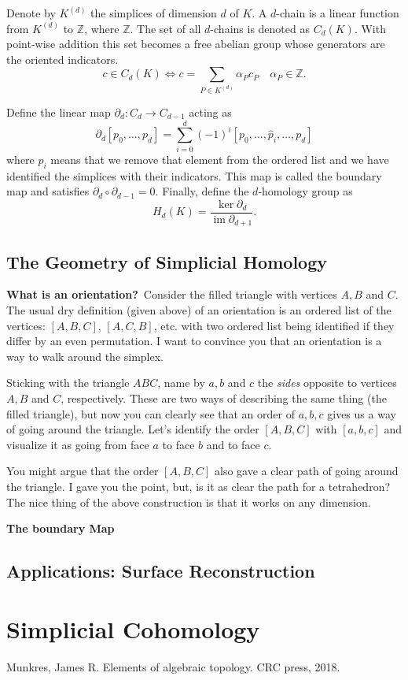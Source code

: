 \documentclass{article}
\newcommand{\Z}{\mathbb Z}
\DeclareMathOperator{\im}{im}
\begin{document}
Denote by \(K^{(d)}\) the simplices of dimension \(d\) of \(K\). A \(d\)-chain is
a linear function from \(K^{(d)}\) to \(\Z\), where \(\Z\).
The set of all \(d\)-chains is denoted as \(C_d(K)\). With point-wise addition
this set becomes a free abelian group whose generators are the oriented indicators.
\begin{displaymath}
  c\in C_d(K) \iff c = \sum_{P\in K^{(d)}} \alpha_P c_P
  \quad \alpha_P\in \Z.
\end{displaymath}

Define the linear map \(\partial_d\colon C_d \to C_{d-1}\) acting as
\begin{displaymath}
  \partial_d [p_0, \ldots, p_d] = \sum_{i=0}^{d} (-1)^{i} [p_0, \ldots, \hat p_i, \ldots, p_d]
\end{displaymath}
where \(\hat p_i\) means that we remove that element from the ordered list and we have identified
the simplices with their indicators.
This map is called the boundary map and satisfies \(\partial_{d} \circ
\partial_{d-1} = 0\). Finally, define the \(d\)-homology group as
\begin{displaymath}
  H_d(K) = \frac{\ker \partial_{d}}{\im \partial_{d+1}}.
\end{displaymath}

\subsection{The Geometry of Simplicial Homology}

\textbf{What is an orientation?}~Consider the filled triangle with vertices
\(A,B\) and \(C\). The usual dry definition (given above) of an orientation is an
ordered list of the vertices: \([A,B,C]\), \([A,C,B]\), etc. with two ordered
list being identified if they differ by an even permutation. I want to convince
you that an orientation is a way to walk around the simplex.

Sticking with the triangle \(ABC\), name by \(a,b\) and \(c\) the
\textit{sides} opposite to vertices \(A,B\) and \(C\), respectively.
These are two ways of describing the same thing (the filled triangle),
but now you can clearly see that an order of \(a,b,c\) gives us a way
of going around the triangle. Let's identify the order \([A,B,C]\)
with \([a,b,c]\) and visualize it as going from face \(a\) to face \(b\) 
and to face \(c\).

You might argue that the order \([A,B,C]\) also gave a clear path of going
around the triangle. I gave you the point, but, is it as clear the path for a
tetrahedron? The nice thing of the above construction is that it works on any
dimension.

\medskip
\textbf{The boundary Map}~ 


\subsection{Applications: Surface Reconstruction}


\section{Simplicial Cohomology}

\begin{thebibliography}{9}
  Munkres, James R. Elements of algebraic topology. CRC press, 2018.
\end{thebibliography}
\end{document}
